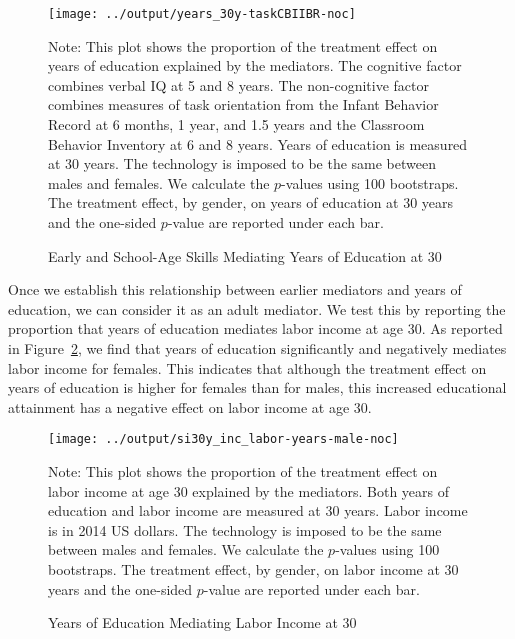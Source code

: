 \begin{figure}[H]
\begin{center}
\caption{Early and School-Age Skills Mediating Years of Education at 30}
\label{fig:task-years}
	\texttt{[image: ../output/years\_30y-taskCBIIBR-noc]}
\end{center}
\raggedright
Note: This plot shows the proportion of the treatment effect on years of education explained by the mediators. The cognitive factor combines verbal IQ at 5 and 8 years. The non-cognitive factor combines measures of task orientation from the Infant Behavior Record at 6 months, 1 year, and 1.5 years and the Classroom Behavior Inventory at 6 and 8 years. Years of education is measured at 30 years. The technology is imposed to be the same between males and females. We calculate the $p$-values using 100 bootstraps. The treatment effect, by gender, on years of education at 30 years and the one-sided $p$-value are reported under each bar.
\end{figure}

Once we establish this relationship between earlier mediators and years of education, we can consider it as an adult mediator. We test this by reporting the proportion that years of education mediates labor income at age 30. As reported in Figure~\ref{fig:years-income30}, we find that years of education significantly and negatively mediates labor income for females. This indicates that although the treatment effect on years of education is higher for females than for males, this increased educational attainment has a negative effect on labor income at age 30. 

\begin{figure}[H]
\begin{center}
\caption{Years of Education Mediating Labor Income at 30}
\label{fig:years-income30}
	\texttt{[image: ../output/si30y\_inc\_labor-years-male-noc]}
\end{center}
\raggedright
Note: This plot shows the proportion of the treatment effect on labor income at age 30 explained by the mediators. Both years of education and labor income are measured at 30 years. Labor income is in 2014 US dollars. The technology is imposed to be the same between males and females. We calculate the $p$-values using 100 bootstraps. The treatment effect, by gender, on labor income at 30 years and the one-sided $p$-value are reported under each bar.
\end{figure}

